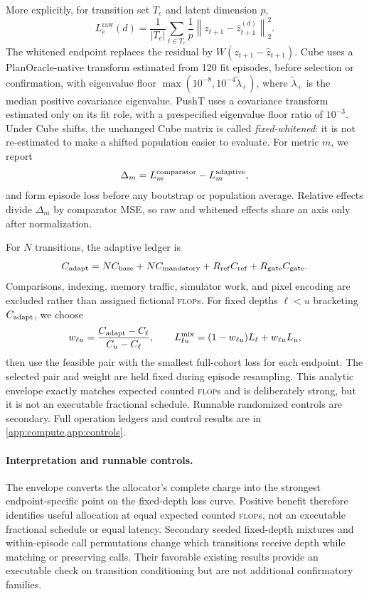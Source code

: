 \documentclass{article}
\newcommand{\flops}{\textsc{flop}s}
\newcommand{\raw}{\mathrm{raw}}
\newcommand{\benefit}{\Delta}
\begin{document}
More explicitly, for transition set \(T_e\) and latent dimension \(p\),
\begin{equation}
 L_e^{\raw}(d)=\frac{1}{|T_e|}\sum_{t\in T_e}\frac{1}{p}
 \left\|z_{t+1}-\hat z^{(d)}_{t+1}\right\|_2^2 .
 \label{eq:rawloss}
\end{equation}
The whitened endpoint replaces the residual by \(W(z_{t+1}-\hat z_{t+1})\). Cube uses a PlanOracle-native transform estimated from 120 fit episodes, before selection or confirmation, with eigenvalue floor \(\max(10^{-8},10^{-4}\tilde\lambda_+)\), where \(\tilde\lambda_+\) is the median positive covariance eigenvalue. PushT uses a covariance transform estimated only on its fit role, with a prespecified eigenvalue floor ratio of \(10^{-3}\). Under Cube shifts, the unchanged Cube matrix is called \emph{fixed-whitened}: it is not re-estimated to make a shifted population easier to evaluate. For metric \(m\), we report
\begin{equation}
 \benefit_m=L_m^{\rm comparator}-L_m^{\rm adaptive},
 \label{eq:benefit}
\end{equation}
and form episode loss before any bootstrap or population average. Relative effects divide \(\benefit_m\) by comparator MSE, so raw and whitened effects share an axis only after normalization.

For \(N\) transitions, the adaptive ledger is
\begin{equation}
 C_{\rm adapt}=NC_{\rm base}+NC_{\rm mandatory}
   +R_{\rm ref}C_{\rm ref}+R_{\rm gate}C_{\rm gate}.
 \label{eq:ledger}
\end{equation}
Comparisons, indexing, memory traffic, simulator work, and pixel encoding are excluded rather than assigned fictional \flops{}. For fixed depths \(\ell<u\) bracketing \(C_{\rm adapt}\), we choose
\begin{equation}
 w_{\ell u}=\frac{C_{\rm adapt}-C_\ell}{C_u-C_\ell},\qquad
 L^{\rm mix}_{\ell u}=(1-w_{\ell u})L_\ell+w_{\ell u}L_u ,
\end{equation}
then use the feasible pair with the smallest full-cohort loss for each endpoint. The selected pair and weight are held fixed during episode resampling. This analytic envelope exactly matches expected counted \flops{} and is deliberately strong, but it is not an executable fractional schedule. Runnable randomized controls are secondary. Full operation ledgers and control results are in \cref{app:compute,app:controls}.

\paragraph{Interpretation and runnable controls.}
The envelope converts the allocator's complete charge into the strongest endpoint-specific point on the fixed-depth loss curve. Positive benefit therefore identifies useful allocation at equal expected counted \flops{}, not an executable fractional schedule or equal latency. Secondary seeded fixed-depth mixtures and within-episode call permutations change which transitions receive depth while matching or preserving calls. Their favorable existing results provide an executable check on transition conditioning but are not additional confirmatory families.
\end{document}
